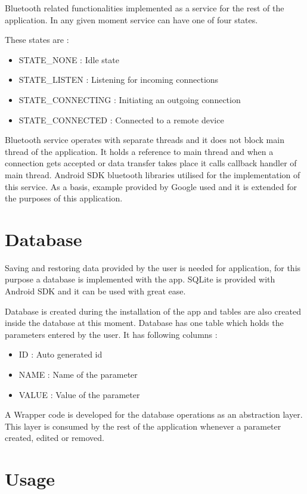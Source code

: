 Bluetooth related functionalities implemented as a service for the rest of the application. In any given moment service can have one of four states. 

These states are :
\begin{itemize}
	\item STATE\_NONE		: Idle state
	\item STATE\_LISTEN		: Listening for incoming connections
	\item STATE\_CONNECTING	: Initiating an outgoing connection
	\item STATE\_CONNECTED	: Connected to a remote device
\end{itemize}

Bluetooth service operates with separate threads and it does not block main thread of the application. It holds a reference to main thread and when a connection gets accepted or data transfer takes place it calls callback handler of main thread. 
Android SDK bluetooth libraries utilised for the implementation of this service. As a basis, example provided by Google \cite{google-bluetooth} used and it is extended for the purposes of this application.

\section{Database}
Saving and restoring data provided by the user is needed for application, for this purpose a database is implemented with the app. SQLite \cite{google-sqlite} is provided with Android SDK and it can be used with great ease.

Database is created during the installation of the app and tables are also created inside the database at this moment. Database has one table which holds the parameters entered by the user. It has following columns :

\begin{itemize}
	\item ID		: Auto generated id 
	\item NAME		: Name of the parameter
	\item VALUE		: Value of the parameter
\end{itemize}

A Wrapper code is developed for the database operations as an abstraction layer. This layer is consumed by the rest of the application whenever a parameter created, edited or removed. 

\section{Usage}

